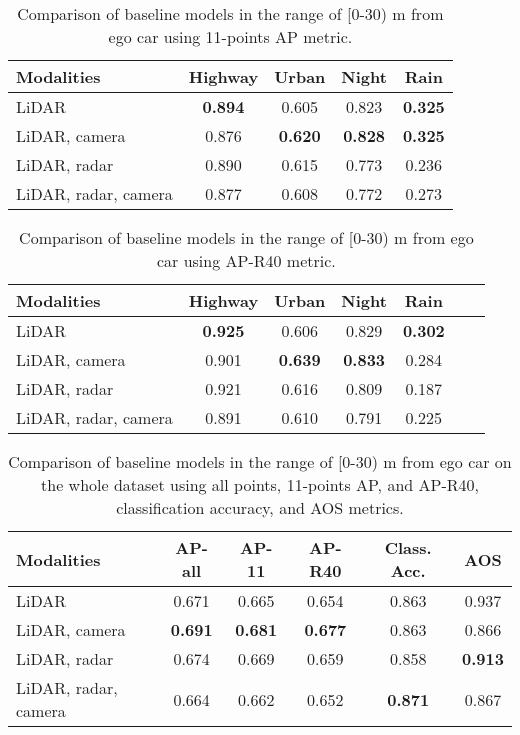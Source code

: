 \documentclass{article}
\begin{document}
\begin{table*}[!h]
  \small
  \centering
  \begin{tabular}{@{}l|cccc@{}}
    \toprule
    Modalities          & Highway   & Urban     & Night     & Rain \\
    \midrule
    LiDAR               & \bf{0.894}& 0.605     & 0.823     & \bf{0.325} \\
    LiDAR, camera       & 0.876     & \bf{0.620}& \bf{0.828}& \bf{0.325} \\
    LiDAR, radar        & 0.890     & 0.615     & 0.773     & 0.236 \\
    LiDAR, radar, camera & 0.877    & 0.608     & 0.772     & 0.273 \\
    \bottomrule
  \end{tabular}
  \caption{Comparison of baseline models in the range of [0-30) m from ego car using 11-points AP metric.}
  \label{tab:metrics2}
\end{table*}

\begin{table*}[!h]
  \small
  \centering
  \begin{tabular}{@{}l|cccccc@{}}
    \toprule
    Modalities          & Highway   & Urban     & Night     & Rain \\
    \midrule
    LiDAR               & \bf{0.925}& 0.606     & 0.829     & \bf{0.302} \\
    LiDAR, camera       & 0.901     & \bf{0.639}& \bf{0.833}& 0.284 \\
    LiDAR, radar        & 0.921     & 0.616     & 0.809     & 0.187 \\
    LiDAR, radar, camera & 0.891    & 0.610     & 0.791     & 0.225 \\
    \bottomrule
  \end{tabular}
  \caption{Comparison of baseline models in the range of [0-30) m from ego car using AP-R40 metric.}
  \label{tab:metrics3}
\end{table*}

\begin{table*}[!h]
  \small
  \centering
  \begin{tabular}{@{}l|ccccc@{}}
    \toprule
    Modalities          & AP-all    & AP-11     & AP-R40    & Class. Acc.   & AOS\\
    \midrule
    LiDAR               & 0.671     & 0.665     & 0.654     & 0.863         & 0.937 \\
    LiDAR, camera       & \bf{0.691}& \bf{0.681}& \bf{0.677}& 0.863         & 0.866 \\
    LiDAR, radar        & 0.674     & 0.669     & 0.659     & 0.858         & \bf{0.913} \\
    LiDAR, radar, camera & 0.664    & 0.662     & 0.652     & \bf{0.871}    & 0.867 \\
    \bottomrule
  \end{tabular}
  \caption{Comparison of baseline models in the range of [0-30) m from ego car on the whole dataset using all points, 11-points AP, and AP-R40, classification accuracy, and AOS metrics.}
  \label{tab:metrics4}
\end{table*}
\end{document}
